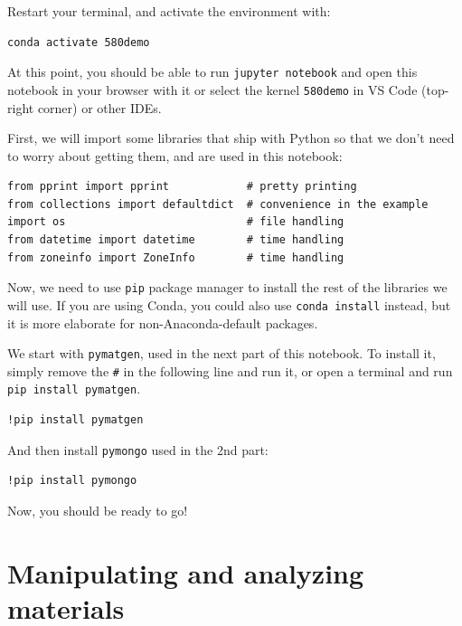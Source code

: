 Restart your terminal, and activate the environment with:

\begin{verbatim}
conda activate 580demo
\end{verbatim}

At this point, you should be able to run
\texttt{jupyter notebook} and open this notebook in
your browser with it or select the kernel
\texttt{580demo} in VS Code (top-right corner) or other
IDEs.

First, we will import some libraries that ship with Python so that we
don't need to worry about getting them, and are used in this notebook:

\begin{verbatim}
from pprint import pprint            # pretty printing
from collections import defaultdict  # convenience in the example
import os                            # file handling
from datetime import datetime        # time handling
from zoneinfo import ZoneInfo        # time handling
\end{verbatim}

Now, we need to use \texttt{pip} package manager to
install the rest of the libraries we will use. If you are using Conda,
you could also use \texttt{conda install} instead, but
it is more elaborate for non-Anaconda-default packages.

We start with \texttt{pymatgen}, used in the next part
of this notebook. To install it, simply remove the
\texttt{\#} in the following line and run it, or open a
terminal and run \texttt{pip install pymatgen}.

\begin{verbatim}
!pip install pymatgen
\end{verbatim}

And then install \texttt{pymongo} used in the 2nd part:

\begin{verbatim}
!pip install pymongo
\end{verbatim}

Now, you should be ready to go!

\hypertarget{manipulating-and-analyzing-materials}{%
\section{Manipulating and analyzing
materials}\label{pysipfenntutorial:manipulating-and-analyzing-materials}}

